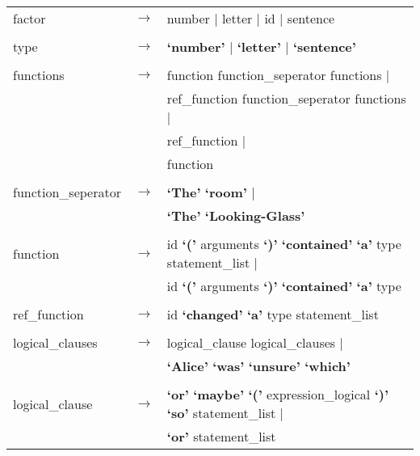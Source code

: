 \documentclass[landscape]{article}
\begin{document}
\begin{longtable}{ l c l}
    \\

    factor & \ensuremath{\to} &  number  | letter  | id  | sentence   \\

    \\

    type & \ensuremath{\to} &  \textbf{`number'}  | \textbf{`letter'}  | \textbf{`sentence'}   \\

    \\

    functions & \ensuremath{\to} &  function  function\_seperator  functions   | \\
    & &  ref\_function  function\_seperator  functions   | \\
    & &  ref\_function   | \\
    & &  function \\

    \\

    function\_seperator & \ensuremath{\to} &  \textbf{`The'} \textbf{`room'}  | \\
    & & \textbf{`The'} \textbf{`Looking-Glass'} \\

    \\

    function & \ensuremath{\to} &  id \textbf{`('} arguments  \textbf{`)'} \textbf{`contained'} \textbf{`a'} type  statement\_list   | \\
    & &  id \textbf{`('} arguments  \textbf{`)'} \textbf{`contained'} \textbf{`a'} type \\

    \\

    ref\_function & \ensuremath{\to} &  id \textbf{`changed'} \textbf{`a'} type  statement\_list  \\

    \\

    logical\_clauses & \ensuremath{\to} &  logical\_clause  logical\_clauses   | \\
    & &  \textbf{`Alice'} \textbf{`was'} \textbf{`unsure'} \textbf{`which'}  \\

    \\

    logical\_clause & \ensuremath{\to} &  \textbf{`or'} \textbf{`maybe'} \textbf{`('} expression\_logical  \textbf{`)'} \textbf{`so'} statement\_list   | \\
    & &  \textbf{`or'} statement\_list   \\


\end{longtable}
\end{document}
